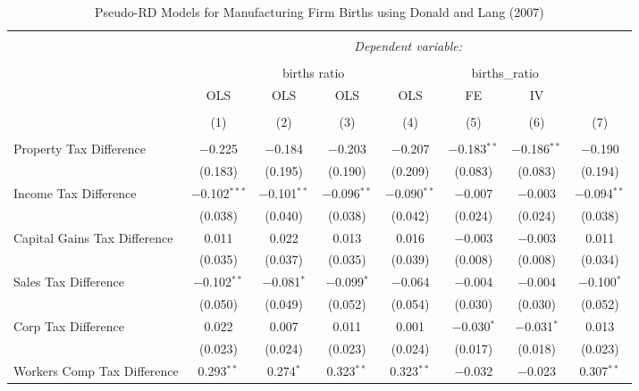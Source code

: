 
\begin{table}[!htbp] \centering 
  \caption{Pseudo-RD Models for  Manufacturing Firm Births using Donald and Lang (2007)} 
  \label{} 
\begin{tabular}{@{\extracolsep{5pt}}lccccccc} 
\\[-1.8ex]\hline 
\hline \\[-1.8ex] 
 & \multicolumn{7}{c}{\textit{Dependent variable:}} \\ 
\cline{2-8} 
\\[-1.8ex] & \multicolumn{4}{c}{births ratio} & \multicolumn{2}{c}{births\_ratio} &   \\ 
 & OLS & OLS & OLS & OLS & FE & IV &  \\ 
\\[-1.8ex] & (1) & (2) & (3) & (4) & (5) & (6) & (7)\\ 
\hline \\[-1.8ex] 
 Property Tax Difference & $-$0.225 & $-$0.184 & $-$0.203 & $-$0.207 & $-$0.183$^{**}$ & $-$0.186$^{**}$ & $-$0.190 \\ 
  & (0.183) & (0.195) & (0.190) & (0.209) & (0.083) & (0.083) & (0.194) \\ 
  Income Tax Difference & $-$0.102$^{***}$ & $-$0.101$^{**}$ & $-$0.096$^{**}$ & $-$0.090$^{**}$ & $-$0.007 & $-$0.003 & $-$0.094$^{**}$ \\ 
  & (0.038) & (0.040) & (0.038) & (0.042) & (0.024) & (0.024) & (0.038) \\ 
  Capital Gains Tax Difference & 0.011 & 0.022 & 0.013 & 0.016 & $-$0.003 & $-$0.003 & 0.011 \\ 
  & (0.035) & (0.037) & (0.035) & (0.039) & (0.008) & (0.008) & (0.034) \\ 
  Sales Tax Difference & $-$0.102$^{**}$ & $-$0.081$^{*}$ & $-$0.099$^{*}$ & $-$0.064 & $-$0.004 & $-$0.004 & $-$0.100$^{*}$ \\ 
  & (0.050) & (0.049) & (0.052) & (0.054) & (0.030) & (0.030) & (0.052) \\ 
  Corp Tax Difference & 0.022 & 0.007 & 0.011 & 0.001 & $-$0.030$^{*}$ & $-$0.031$^{*}$ & 0.013 \\ 
  & (0.023) & (0.024) & (0.023) & (0.024) & (0.017) & (0.018) & (0.023) \\ 
  Workers Comp Tax Difference & 0.293$^{**}$ & 0.274$^{*}$ & 0.323$^{**}$ & 0.323$^{**}$ & $-$0.032 & $-$0.023 & 0.307$^{**}$ \\ 

\end{tabular}
\end{table}
